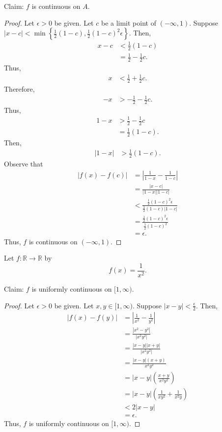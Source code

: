 \documentclass[12pt]{article}
\begin{document}
\newpage
{} Claim: $f$ is continuous on $A$.
\begin{proof}
    Let $\epsilon > 0$ be given. Let $c$ be a limit point of $(-\infty, 1)$. Suppose $|x - c| < \min\left\{\frac12(1-c), \frac12(1-c)^2\epsilon\right\}$. Then,
    \begin{align*}
        x - c &< \frac12(1 - c) \\
              &= \frac12 - \frac12c.
    \end{align*} Thus,
    \begin{align*}
        x &< \frac12 + \frac12c.
    \end{align*} Therefore,
    \begin{align*}
        -x &> -\frac12 - \frac12c.
    \end{align*} Thus,
    \begin{align*}
        1 - x &> \frac12 - \frac12c \\
              &= \frac12(1-c).
    \end{align*} Then,
    \begin{align*}
        |1 - x| &> \frac12(1-c).
    \end{align*} Observe that
    \begin{align*}
        |f(x) - f(c)| &= \left| \frac1{1-x} - \frac1{1-c} \right| \\
                      &= \frac{|x-c|}{|1-x||1-c|} \\
                      &< \frac{\frac12(1-c)^2\epsilon}{\frac12(1-c)|1-c|} \\
                      &= \frac{\frac12(1-c)^2\epsilon}{\frac12(1-c)^2} \\
                      &= \epsilon.
    \end{align*}
    Thus, $f$ is continuous on $(-\infty, 1)$.

\end{proof}

\newpage
{} Let $f: \mathbb R \to \mathbb R$ by $$f(x) = \frac1{x^2}.$$

\medskip
{} Claim: $f$ is uniformly continuous on $[1,\infty)$.
\begin{proof}
    Let $\epsilon > 0$ be given.
    Let $x, y \in [1, \infty)$.
    Suppose $|x-y| < \frac\epsilon2$.
    Then,
    \begin{align*}
        |f(x) - f(y)| &= \left| \frac1{x^2} - \frac1{y^2} \right| \\
                      &= \frac{|x^2-y^2|}{|x^2y^2|} \\
                      &= \frac{|x-y||x+y|}{|x^2y^2|} \\
                      &= \frac{|x-y|(x+y)}{x^2y^2} \\
                      &= |x-y|\left( \frac{x+y}{x^2y^2} \right) \\
                      &= |x-y|\left( \frac1{xy^2} + \frac1{x^2y} \right) \\
                      &< 2|x-y| \\
                      &= \epsilon.
    \end{align*}
    Thus, $f$ is uniformly continuous on $[1, \infty)$.
\end{proof}
\end{document}
